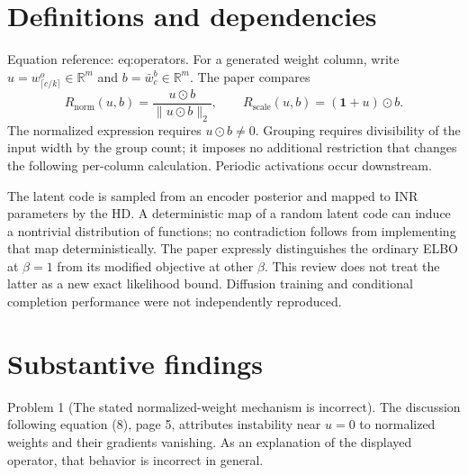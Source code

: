 \documentclass[10pt]{article}
\begin{document}
\section*{Definitions and dependencies}
Equation reference: eq:operators. For a generated weight column, write \(u=w^o_{\lceil c/k\rceil}\in\mathbb R^m\) and \(b=\bar w^b_c\in\mathbb R^m\). The paper compares \[R_{\mathrm{norm}}(u,b)=\frac{u\odot b}{\|u\odot b\|_2},
 \qquad
 R_{\mathrm{scale}}(u,b)=(\mathbf 1+u)\odot b.
 \] The normalized expression requires \(u\odot b\ne0\). Grouping requires divisibility of the input width by the group count; it imposes no additional restriction that changes the following per-column calculation. Periodic activations occur downstream.\par
The latent code is sampled from an encoder posterior and mapped to INR parameters by the HD. A deterministic map of a random latent code can induce a nontrivial distribution of functions; no contradiction follows from implementing that map deterministically. The paper expressly distinguishes the ordinary ELBO at \(\beta=1\) from its modified objective at other \(\beta\). This review does not treat the latter as a new exact likelihood bound. Diffusion training and conditional completion performance were not independently reproduced.\par
\section*{Substantive findings}
Problem 1 (The stated normalized-weight mechanism is incorrect).  The discussion following equation (8), page 5, attributes instability near \(u=0\) to normalized weights and their gradients vanishing. As an explanation of the displayed operator, that behavior is incorrect in general.\par
\end{document}
